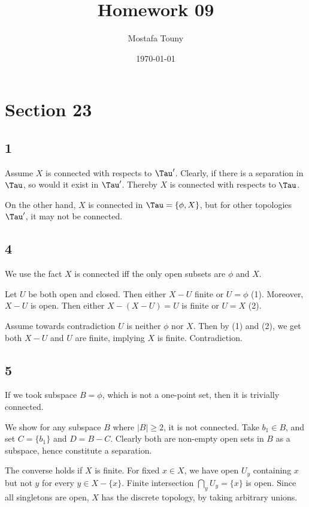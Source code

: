\documentclass[12pt]{extarticle}
\title{Homework 09}
\author{Mostafa Touny}
\date{\today}
\begin{document}
\maketitle
\tableofcontents

\newpage

\section{Section 23}

\subsection{1}

Assume $X$ is connected with respects to $\Tau'$. Clearly, if there is a separation in $\Tau$, so would it exist in $\Tau'$. Thereby $X$ is connected with respects to $\Tau$.

On the other hand, $X$ is connected in $\Tau = \{ \phi, X \}$, but for other topologies $\Tau'$, it may not be connected.


\subsection{4}

We use the fact $X$ is connected iff the only open subsets are $\phi$ and $X$.

Let $U$ be both open and closed. Then either $X-U$ finite or $U = \phi$ (1). Moreover, $X-U$ is open. Then either $X - (X - U) = U$ is finite or $U = X$ (2).

Assume towards contradiction $U$ is neither $\phi$ nor $X$. Then by (1) and (2), we get both $X-U$ and $U$ are finite, implying $X$ is finite. Contradiction.


\subsection{5}

If we took subspace $B = \phi$, which is not a one-point set, then it is trivially connected.

We show for any subspace $B$ where $|B| \geq 2$, it is not connected. Take $b_1 \in B$, and set $C = \{ b_1 \}$ and $D = B - C$. Clearly both are non-empty open sets in $B$ as a subspace, hence constitute a separation.

The converse holds if $X$ is finite. For fixed $x \in X$, we have open $U_y$ containing $x$ but not $y$ for every $y \in X - \{x\}$. Finite intersection $\bigcap_y U_y = \{ x \}$ is open. Since all singletons are open, $X$ has the discrete topology, by taking arbitrary unions.
\end{document}
